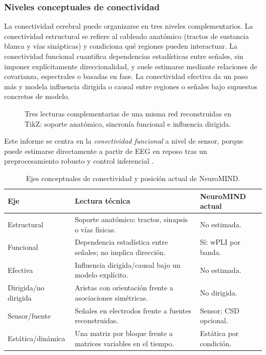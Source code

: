 \subsubsection{Niveles conceptuales de conectividad}

La conectividad cerebral puede organizarse en tres niveles complementarios. La conectividad estructural se refiere al cableado anatómico (tractos de sustancia blanca y vías sinápticas) y condiciona qué regiones pueden interactuar. La conectividad funcional cuantifica dependencias estadísticas entre señales, sin imponer explícitamente direccionalidad, y suele estimarse mediante relaciones de covarianza, espectrales o basadas en fase. La conectividad efectiva da un paso más y modela influencia dirigida o causal entre regiones o señales bajo supuestos concretos de modelo.

\begin{fullwidth}
\begin{figure}[H]
\centering
\resizebox{0.86\fulltextwidth}{!}{\NSConnectivityPerspectives}
\caption{Tres lecturas complementarias de una misma red reconstruidas en TikZ: soporte anatómico, sincronía funcional e influencia dirigida.}
\label{fig:connectivity-three-perspectives}
\end{figure}
\end{fullwidth}

Este informe se centra en la \emph{conectividad funcional} a nivel de sensor, porque puede estimarse directamente a partir de EEG en reposo tras un preprocesamiento robusto y control inferencial \citep{Cohen2014,Vinck2011WPLI,Cao2022EEGConnectivity}.

\begin{table}[H]
\centering
\small
\caption{Ejes conceptuales de conectividad y posición actual de NeuroMIND.}
\label{tab:connectivity-concepts}
\begin{tabular}{@{}p{}p{}p{}@{}}
\toprule
\textbf{Eje} & \textbf{Lectura técnica} & \textbf{NeuroMIND actual} \\
\midrule
Estructural & Soporte anatómico: tractos, sinapsis o vías físicas. & No estimada. \\
Funcional & Dependencia estadística entre señales; no implica dirección. & Sí: wPLI por banda. \\
Efectiva & Influencia dirigida/causal bajo un modelo explícito. & No estimada. \\
Dirigida/no dirigida & Aristas con orientación frente a asociaciones simétricas. & No dirigida. \\
Sensor/fuente & Señales en electrodos frente a fuentes reconstruidas. & Sensor; CSD opcional. \\
Estática/dinámica & Una matriz por bloque frente a matrices variables en el tiempo. & Estática por condición. \\
\bottomrule
\end{tabular}
\end{table}

